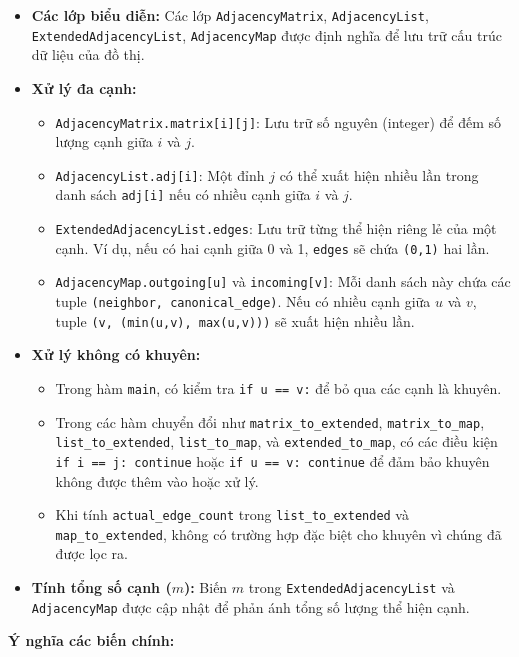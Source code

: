 \documentclass{article}
\begin{document}
\begin{itemize}
    \item \textbf{Các lớp biểu diễn:} Các lớp \texttt{AdjacencyMatrix}, \texttt{AdjacencyList}, \texttt{ExtendedAdjacencyList}, \texttt{AdjacencyMap} được định nghĩa để lưu trữ cấu trúc dữ liệu của đồ thị.
    \item \textbf{Xử lý đa cạnh:}
    \begin{itemize}
        \item \texttt{AdjacencyMatrix.matrix[i][j]}: Lưu trữ số nguyên (integer) để đếm số lượng cạnh giữa $i$ và $j$.
        \item \texttt{AdjacencyList.adj[i]}: Một đỉnh $j$ có thể xuất hiện nhiều lần trong danh sách \texttt{adj[i]} nếu có nhiều cạnh giữa $i$ và $j$.
        \item \texttt{ExtendedAdjacencyList.edges}: Lưu trữ từng thể hiện riêng lẻ của một cạnh. Ví dụ, nếu có hai cạnh giữa 0 và 1, \texttt{edges} sẽ chứa \texttt{(0,1)} hai lần.
        \item \texttt{AdjacencyMap.outgoing[u]} và \texttt{incoming[v]}: Mỗi danh sách này chứa các tuple \texttt{(neighbor, canonical\_edge)}. Nếu có nhiều cạnh giữa $u$ và $v$, tuple \texttt{(v, (min(u,v), max(u,v)))} sẽ xuất hiện nhiều lần.
    \end{itemize}
    \item \textbf{Xử lý không có khuyên:}
    \begin{itemize}
        \item Trong hàm \texttt{main}, có kiểm tra \texttt{if u == v:} để bỏ qua các cạnh là khuyên.
        \item Trong các hàm chuyển đổi như \texttt{matrix\_to\_extended}, \texttt{matrix\_to\_map}, \texttt{list\_to\_extended}, \texttt{list\_to\_map}, và \texttt{extended\_to\_map}, có các điều kiện \texttt{if i == j: continue} hoặc \texttt{if u == v: continue} để đảm bảo khuyên không được thêm vào hoặc xử lý.
        \item Khi tính \texttt{actual\_edge\_count} trong \texttt{list\_to\_extended} và \texttt{map\_to\_extended}, không có trường hợp đặc biệt cho khuyên vì chúng đã được lọc ra.
    \end{itemize}
    \item \textbf{Tính tổng số cạnh ($m$):} Biến $m$ trong \texttt{ExtendedAdjacencyList} và \texttt{AdjacencyMap} được cập nhật để phản ánh tổng số lượng thể hiện cạnh.
\end{itemize}

\textbf{Ý nghĩa các biến chính:}
\end{document}
